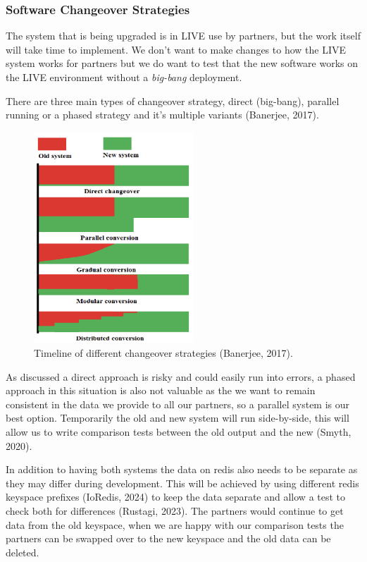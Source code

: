   \subsubsection{Software Changeover Strategies}
  The system that is being upgraded is in LIVE use by partners, but the work itself will take time to implement. We don't want to make changes to how
  the LIVE system works for partners but we do want to test that the new software works on the LIVE environment without a \textit{big-bang} deployment.

  There are three main types of changeover strategy, direct (big-bang), parallel running or a phased strategy and it's multiple variants (Banerjee, 2017). 
  
  \begin{figure}[H]
    \centering
    \includegraphics[width=6cm]{assets/changeoverStrategies.png}
    \caption{Timeline of different changeover strategies (Banerjee, 2017).}
    \label{fig:changeoverStrategies}
  \end{figure}
  
  As discussed a direct approach is risky and could easily run into errors, a phased approach in this situation is also not valuable as the we want 
  to remain consistent in the data we provide to all our partners, so a parallel system is our best option. Temporarily the old and new system will 
  run side-by-side, this will allow us to write comparison tests between the old output and the new (Smyth, 2020).

  In addition to having both systems the data on redis also needs to be separate as they may differ during development. This will be achieved by 
  using different redis keyspace prefixes (IoRedis, 2024) to keep the data separate and allow a test to check both for differences (Rustagi, 2023). 
  The partners would continue to get data from the old keyspace, when we are happy with our comparison tests the partners can be swapped over to the new 
  keyspace and the old data can be deleted. 

\newpage